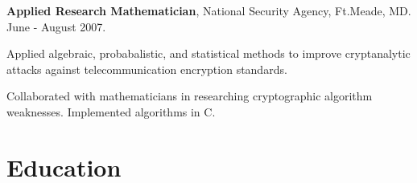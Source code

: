 \documentclass{article}
\begin{document}
\begin{itemize*}
  \item {\bf Applied Research Mathematician}, National Security Agency,
    Ft.Meade, MD. June - August 2007.
    \begin{itemize*}
    \item Applied algebraic, probabalistic, and statistical methods to improve
      cryptanalytic attacks against telecommunication encryption standards.
    \item Collaborated with mathematicians in researching cryptographic
      algorithm weaknesses. Implemented algorithms in C.
    \end{itemize*}
\end{itemize*}


\section*{Education}
\end{document}
